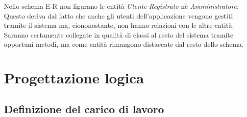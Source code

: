 \documentclass[12pt,a4paper,onecolumn,x11names]{article}
\begin{document}
	\begin{flushleft}
		Nello schema E-R non figurano le entità \textit{Utente Registrato} nè \textit{Amministratore}. Questo deriva dal fatto che anche gli utenti dell'applicazione vengono gestiti tramite il sistema ma, ciononostante, non hanno relazioni con le altre entità. Saranno certamente collegate in qualità di classi al resto del sistema tramite opportuni metodi, ma come entità rimangono distaccate dal resto dello schema.
		
	\end{flushleft}
	
		\clearpage

\section{Progettazione logica}

\subsection{Definizione del carico di lavoro}
\end{document}
